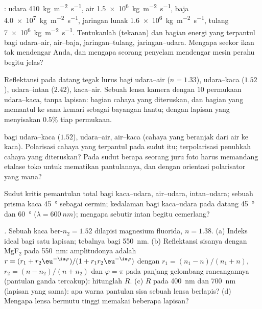 \begin{exercise}[$\star$]\label{exo:b2:wave-interfaces:1}
: udara \qty{410}{kg.m^{-2}.s^{-1}}, air \qty{1.5e6}{kg.m^{-2}.s^{-1}},
baja \qty{4.0e7}{kg.m^{-2}.s^{-1}}, jaringan lunak \qty{1.6e6}{kg.m^{-2}.s^{-1}}, tulang
\qty{7e6}{kg.m^{-2}.s^{-1}}. Tentukanlah  (tekanan) dan bagian
energi yang terpantul bagi udara--air, air--baja, jaringan--tulang,
jaringan--udara. Mengapa seekor ikan tak mendengar Anda, dan mengapa seorang penyelam mendengar
mesin perahu begitu jelas?
\end{exercise}

\begin{exercise}[$\star$]\label{exo:b2:wave-interfaces:2}
Reflektansi pada datang tegak lurus bagi udara--air ($n = 1.33$), udara--kaca
($1.52$), udara--intan ($2.42$), kaca--air. Sebuah lensa kamera dengan $10$
permukaan udara--kaca, tanpa lapisan: bagian cahaya yang diteruskan, dan
bagian yang memantul ke sana kemari sebagai bayangan hantu; dengan lapisan yang menyisakan
$0.5\%$ tiap permukaan.
\end{exercise}

\begin{exercise}[$\star$]\label{exo:b2:wave-interfaces:3}
 bagi udara--kaca ($1.52$), udara--air, air--kaca
(cahaya yang beranjak dari air ke kaca). Polarisasi cahaya yang terpantul
pada sudut itu; terpolarisasi penuhkah cahaya yang diteruskan? Pada
sudut berapa seorang juru foto harus memandang etalase toko untuk mematikan
pantulannya, dan dengan orientasi polarisator yang mana?
\end{exercise}

\begin{exercise}[$\star$]\label{exo:b2:wave-interfaces:4}
Sudut kritis pemantulan total bagi kaca--udara, air--udara,
intan--udara; sebuah prisma kaca \qty{45}{\degree} sebagai cermin; kedalaman
 bagi kaca--udara pada datang \qty{45}{\degree} dan \qty{60}{\degree}
($\lambda = \qty{600}{nm}$); mengapa sebutir intan begitu cemerlang?
\end{exercise}

\begin{exercise}[$\star\star$]\label{exo:b2:wave-interfaces:5}
\emph{.} Sebuah kaca ber-$n_2 = 1.52$ dilapisi
magnesium fluorida, $n = 1.38$. (a) Indeks ideal bagi satu lapisan;
tebalnya bagi \qty{550}{nm}. (b) Reflektansi sisanya dengan MgF$_2$ pada
\qty{550}{nm}: amplitudonya adalah $r = (r_1 + r_2\eu^{-\iu\varphi})/(1 + r_1r_2
\eu^{-\iu\varphi})$ dengan $r_1 = (n_1 - n)/(n_1 + n)$, $r_2 = (n - n_2)/(n + n_2)$
dan $\varphi = \pi$ pada panjang gelombang rancangannya (pantulan ganda
tercakup): hitunglah $R$. (c) $R$ pada \qty{400}{nm} dan \qty{700}{nm} (lapisan
yang sama): apa warna pantulan sisa sebuah lensa berlapis?
(d) Mengapa lensa bermutu tinggi memakai beberapa lapisan?
\end{exercise}

